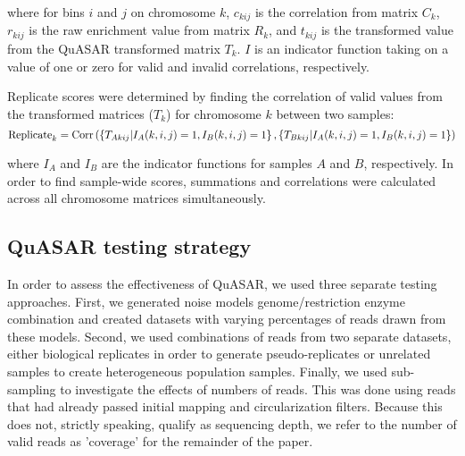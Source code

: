 where for bins $i$ and $j$ on chromosome $k$, $c_{kij}$ is the correlation from matrix $C_k$, $r_{kij}$ is the raw enrichment value from matrix $R_k$, and $t_{kij}$ is the transformed value from the QuASAR transformed matrix $T_k$. $I$ is an indicator function taking on a value of one or zero for valid and invalid correlations, respectively.

Replicate scores were determined by finding the correlation of valid values from the transformed matrices ($T_k$) for chromosome $k$ between two samples:
\[\textnormal{Replicate}_{k}=\textnormal{Corr}\left(\left\{T_{Akij}|I_A(k,i,j)=1,I_B(k,i,j)=1\right\},\left\{T_{Bkij}|I_A(k,i,j)=1,I_B(k,i,j)=1\right\}\right)\]

where $I_A$ and $I_B$ are the indicator functions for samples $A$ and $B$, respectively. In order to find sample-wide scores, summations and correlations were calculated across all chromosome matrices simultaneously.


\subsection{QuASAR testing strategy}

In order to assess the effectiveness of QuASAR, we used three separate testing approaches. First, we generated noise models genome/restriction enzyme combination and created datasets with varying percentages of reads drawn from these models. Second, we used combinations of reads from two separate datasets, either biological replicates in order to generate pseudo-replicates or unrelated samples to create heterogeneous population samples. Finally, we used sub-sampling to investigate the effects of numbers of reads. This was done using \cis reads that had already passed initial mapping and circularization filters. Because this does not, strictly speaking, qualify as sequencing depth, we refer to the number of valid \cis reads as 'coverage' for the remainder of the paper.

